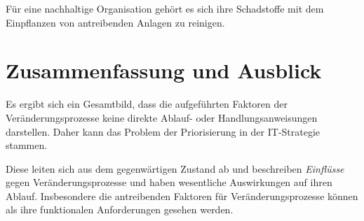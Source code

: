 Für eine nachhaltige Organisation gehört es sich ihre Schadstoffe mit dem Einpflanzen von antreibenden Anlagen zu reinigen.

\section{Zusammenfassung und Ausblick}
Es ergibt sich ein Gesamtbild, dass die aufgeführten Faktoren der Veränderungsprozesse keine direkte Ablauf- oder Handlungsanweisungen darstellen. Daher kann das Problem der Priorisierung in der IT-Strategie stammen.

Diese leiten sich aus dem gegenwärtigen Zustand ab und beschreiben \emph{Einflüsse} gegen Veränderungsprozesse und haben wesentliche Auswirkungen auf ihren Ablauf. Insbesondere die antreibenden Faktoren für Veränderungsprozesse können als ihre funktionalen Anforderungen gesehen werden.

